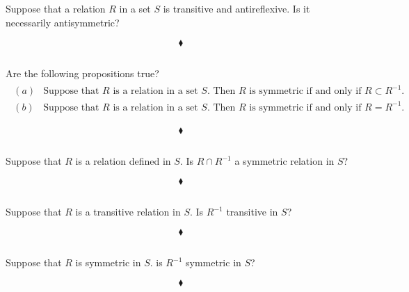 \subsection{}
\begin{tcolorbox}
 Suppose that a relation $R$ in a set $S$ is transitive and antireflexive. Is it necessarily antisymmetric? 
\end{tcolorbox}
$$ $$
$$\blacklozenge$$

\subsection{}
\begin{tcolorbox}
 Are the following propositions true? 
 \begin{align*}
 \begin{array}{ll}
 (a)& \text{Suppose that } R \text{ is a relation in a set } S. \text{ Then } R \text{ is symmetric if and only if }R \subset R^{-1}. \\
 (b)& \text{Suppose that } R \text{ is a relation in a set } S. \text{ Then } R \text{ is symmetric if and only if } R=R^{-1}. 
 \end{array}
 \end{align*}
\end{tcolorbox}
$$ $$
$$\blacklozenge$$

\subsection{}
\begin{tcolorbox}
 Suppose that $R$ is a relation defined in $S$. Is $R \cap R^{-1}$ a symmetric relation in $S$? 
\end{tcolorbox}
$$ $$
$$\blacklozenge$$

\subsection{}
\begin{tcolorbox}
 Suppose that $R$ is a transitive relation in $S$. Is $R^{-1}$ transitive in $S$? 
\end{tcolorbox}
$$ $$
$$\blacklozenge$$


\subsection{}
\begin{tcolorbox}
Suppose that $R$ is symmetric in $S$. is $R^{-1}$ symmetric in $S$? 
\end{tcolorbox}
$$ $$
$$\blacklozenge$$


